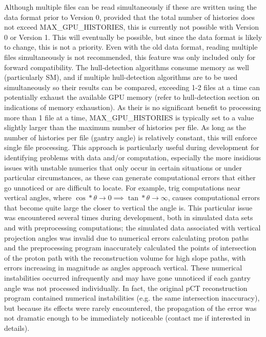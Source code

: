 \documentclass{article}
\begin{document}
Although multiple files can be read simultaneously if these are written using the data format prior to Version 0, provided that the total number of histories does not exceed MAX\_GPU\_HISTORIES, this is currently not possible with Version 0 or Version 1.  This will eventually be possible, but since the data format is likely to change, this is not a priority.  Even with the old data format, reading multiple files simultaneously is not recommended, this feature was only included only for forward compatibility.  The hull-detection algorithms consume memory as well (particularly SM), and if multiple hull-detection algorithms are to be used simultaneously so their results can be compared, exceeding 1-2 files at a time can potentially exhaust the available GPU memory (refer to hull-detection section on indications of memory exhaustion).  As their is no significant benefit to processing more than 1 file at a time, MAX\_GPU\_HISTORIES is typically set to a value slightly larger than the maximum number of histories per file.  As long as the number of histories per file (gantry angle) is relatively constant, this will enforce single file processing.  This approach is particularly useful during development for identifying problems with data and/or computation, especially the more insidious issues with unstable numerics that only occur in certain situations or under particular circumstances, as these can generate computational errors that either go unnoticed or are difficult to locate.  For example, trig computations near vertical angles, where $\cos*{\theta}\to 0\implies \tan*{\theta}\to \infty$, causes computational errors that become quite large the closer to vertical the angle is.  This particular issue was encountered several times during development, both in simulated data sets and with preprocessing computations; the simulated data associated with vertical projection angles was invalid due to numerical errors calculating proton paths and the preprocessing program inaccurately calculated the points of intersection of the proton path with the reconstruction volume for high slope paths, with errors increasing in magnitude as angles approach vertical.  These numerical instabilities occurred infrequently and may have gone unnoticed if each gantry angle was not processed individually.  In fact, the original pCT reconstruction program contained numerical instabilities (e.g. the same intersection inaccuracy), but because its effects were rarely encountered, the propagation of the error was not dramatic enough to be immediately noticeable (contact me if interested in details).
\end{document}
